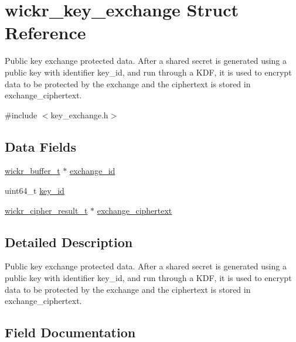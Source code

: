 \hypertarget{structwickr__key__exchange}{}\section{wickr\+\_\+key\+\_\+exchange Struct Reference}
\label{structwickr__key__exchange}


Public key exchange protected data. After a shared secret is generated using a public key with identifier \textquotesingle{}key\+\_\+id\textquotesingle{}, and run through a K\+DF, it is used to encrypt data to be protected by the exchange and the ciphertext is stored in \textquotesingle{}exchange\+\_\+ciphertext\textquotesingle{}.  




{\ttfamily \#include $<$key\+\_\+exchange.\+h$>$}

\subsection*{Data Fields}
\begin{DoxyCompactItemize}
\item 
\mbox{\hyperlink{structwickr__buffer}{wickr\+\_\+buffer\+\_\+t}} $\ast$ \mbox{\hyperlink{structwickr__key__exchange_a744e71ef6676c78643646adf1693a4e5}{exchange\+\_\+id}}
\item 
uint64\+\_\+t \mbox{\hyperlink{structwickr__key__exchange_abc0c1dbc866c150ffc275546b7e91e2d}{key\+\_\+id}}
\item 
\mbox{\hyperlink{structwickr__cipher__result}{wickr\+\_\+cipher\+\_\+result\+\_\+t}} $\ast$ \mbox{\hyperlink{structwickr__key__exchange_ab8399c32f60a1efef3d92f6844db4b54}{exchange\+\_\+ciphertext}}
\end{DoxyCompactItemize}


\subsection{Detailed Description}
Public key exchange protected data. After a shared secret is generated using a public key with identifier \textquotesingle{}key\+\_\+id\textquotesingle{}, and run through a K\+DF, it is used to encrypt data to be protected by the exchange and the ciphertext is stored in \textquotesingle{}exchange\+\_\+ciphertext\textquotesingle{}. 

\subsection{Field Documentation}
\mbox{\label{structwickr__key__exchange_ab8399c32f60a1efef3d92f6844db4b54}} 

